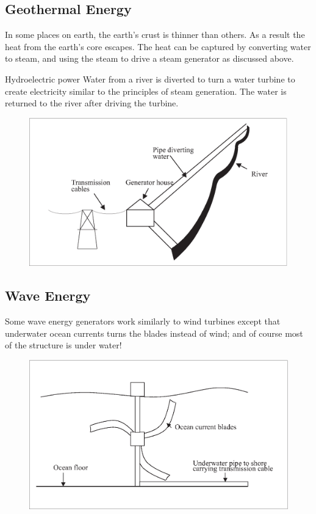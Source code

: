 \subsection*{Geothermal Energy}

In some places on earth, the earth's crust is thinner than others.
As a result the heat from the earth's core escapes. The heat can be
captured by converting water to steam, and using the steam to drive
a steam generator as discussed above.

Hydroelectric power Water from a river is diverted to turn a water
turbine to create electricity similar to the principles of steam
generation. The water is returned to the river after driving the
turbine.

\begin{figure}[H]
\centering
\includegraphics[scale=0.4]{../../epsimages/7hydroelectricriver.eps}
\end{figure}

\subsection*{Wave Energy}

Some wave energy generators work similarly to
wind turbines except that underwater ocean currents turns the blades
instead of wind; and of course most of the structure is under water!
\begin{figure}[H]
\centering
\includegraphics[scale=0.4]{../../epsimages/8hydroelectricocean1.eps}
\end{figure}

